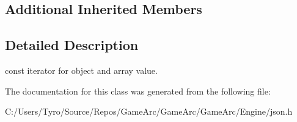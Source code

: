 \subsection*{Additional Inherited Members}


\subsection{Detailed Description}
const iterator for object and array value. 



The documentation for this class was generated from the following file\+:\begin{DoxyCompactItemize}
\item 
C\+:/\+Users/\+Tyro/\+Source/\+Repos/\+Game\+Arc/\+Game\+Arc/\+Game\+Arc/\+Engine/json.\+h\end{DoxyCompactItemize}
